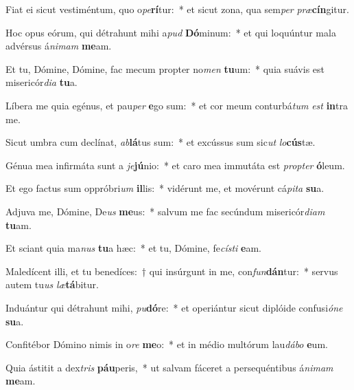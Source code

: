 \item Fiat ei sicut vestiméntum, quo o\textit{pe}\textbf{rí}tur:~* et sicut zona, qua sem\textit{per} \textit{præ}\textbf{cín}gitur.
\item Hoc opus eórum, qui détrahunt mihi a\textit{pud} \textbf{Dó}minum:~* et qui loquúntur mala advérsus á\textit{ni}\textit{mam} \textbf{me}am.
\item Et tu, Dómine, Dómine, fac mecum propter no\textit{men} \textbf{tu}um:~* quia suávis est misericór\textit{di}\textit{a} \textbf{tu}a.
\item Líbera me quia egénus, et pau\textit{per} \textbf{e}go sum:~* et cor meum conturbá\textit{tum} \textit{est} \textbf{in}tra me.
\item Sicut umbra cum declínat, \textit{ab}\textbf{lá}tus sum:~* et excússus sum sic\textit{ut} \textit{lo}\textbf{cús}tæ.
\item Génua mea infirmáta sunt a \textit{je}\textbf{jú}nio:~* et caro mea immutáta est \textit{prop}\textit{ter} \textbf{ó}leum.
\item Et ego factus sum oppróbri\textit{um} \textbf{il}lis:~* vidérunt me, et movérunt cá\textit{pi}\textit{ta} \textbf{su}a.
\item Adjuva me, Dómine, De\textit{us} \textbf{me}us:~* salvum me fac secúndum misericór\textit{di}\textit{am} \textbf{tu}am.
\item Et sciant quia ma\textit{nus} \textbf{tu}a hæc:~* et tu, Dómine, fe\textit{cís}\textit{ti} \textbf{e}am.
\item Maledícent illi, et tu benedíces:~† qui insúrgunt in me, con\textit{fun}\textbf{dán}tur:~* servus autem tu\textit{us} \textit{læ}\textbf{tá}bitur.
\item Induántur qui détrahunt mihi, \textit{pu}\textbf{dó}re:~* et operiántur sicut diplóide confusi\textit{ó}\textit{ne} \textbf{su}a.
\item Confitébor Dómino nimis in o\textit{re} \textbf{me}o:~* et in médio multórum lau\textit{dá}\textit{bo} \textbf{e}um.
\item Quia ástitit a dex\textit{tris} \textbf{páu}peris,~* ut salvam fáceret a persequéntibus á\textit{ni}\textit{mam} \textbf{me}am.
